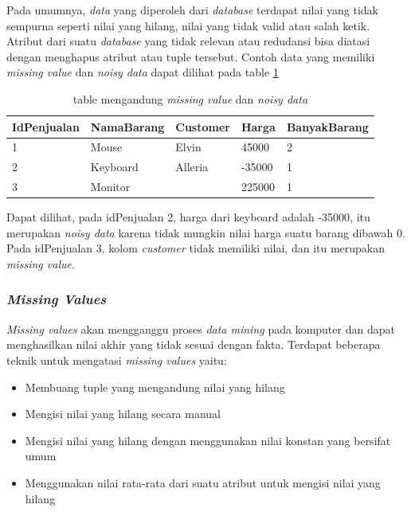 Pada umumnya, \textsl{data} yang diperoleh dari \textsl{database} terdapat nilai yang tidak sempurna seperti nilai yang hilang, nilai yang tidak valid atau salah ketik. Atribut dari suatu \textsl{database} yang tidak relevan atau redudansi bisa diatasi dengan menghapus atribut atau tuple tersebut. Contoh data yang memiliki \textsl{missing value} dan \textsl{noisy data} dapat dilihat pada table \ref{table:contohMissingNNoisy}

\begin{table}[h]
\centering
\caption{table mengandung \textsl{missing value} dan \textsl{noisy data}}
\label{table:contohMissingNNoisy}
\begin{tabular}{|l|l|l|l|l|}
\hline
IdPenjualan & NamaBarang & Customer & Harga  & BanyakBarang \\ \hline
1           & Mouse      & Elvin    & 45000  & 2            \\ \hline
2           & Keyboard   & Alleria  & -35000 & 1            \\ \hline
3           & Monitor    &          & 225000 & 1            \\ \hline
\end{tabular}
\end{table}

Dapat dilihat, pada idPenjualan 2, harga dari keyboard adalah -35000, itu merupakan \textsl{noisy data} karena tidak mungkin nilai harga suatu barang dibawah 0. Pada idPenjualan 3, kolom \textsl{customer} tidak memiliki nilai, dan itu merupakan \textsl{missing value}.

\subsubsection{\textsl{Missing Values}}
\textsl{Missing values} akan mengganggu proses \textsl{data mining} pada komputer dan dapat menghasilkan nilai akhir yang tidak sesuai dengan fakta. Terdapat beberapa teknik untuk mengatasi \textsl{missing values} yaitu:
	\begin{itemize}
		\item Membuang tuple yang mengandung nilai yang hilang\textit{\textit{}}
		\item Mengisi nilai yang hilang secara manual
		\item Mengisi nilai yang hilang dengan menggunakan nilai konstan yang bersifat umum
		\item Menggunakan nilai rata-rata dari suatu atribut untuk mengisi nilai yang hilang
	\end{itemize}
